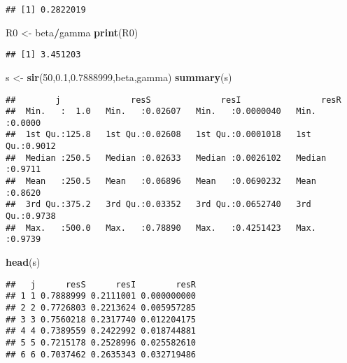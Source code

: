 \documentclass[
]{article}
\newenvironment{Shaded}{\begin{snugshade}}{\end{snugshade}}
\newcommand{\DecValTok}[1]{\textcolor[rgb]{0.00,0.00,0.81}{#1}}
\newcommand{\FloatTok}[1]{\textcolor[rgb]{0.00,0.00,0.81}{#1}}
\newcommand{\KeywordTok}[1]{\textcolor[rgb]{0.13,0.29,0.53}{\textbf{#1}}}
\newcommand{\NormalTok}[1]{#1}
\newcommand{\OperatorTok}[1]{\textcolor[rgb]{0.81,0.36,0.00}{\textbf{#1}}}
\newcommand{\StringTok}[1]{\textcolor[rgb]{0.31,0.60,0.02}{#1}}
\begin{document}
\begin{verbatim}
## [1] 0.2822019
\end{verbatim}

\begin{Shaded}
\begin{Highlighting}[]
\NormalTok{R0 <-}\StringTok{ }\NormalTok{beta}\OperatorTok{/}\NormalTok{gamma}
\KeywordTok{print}\NormalTok{(R0)}
\end{Highlighting}
\end{Shaded}

\begin{verbatim}
## [1] 3.451203
\end{verbatim}

\begin{Shaded}
\begin{Highlighting}[]
\NormalTok{s <-}\StringTok{ }\KeywordTok{sir}\NormalTok{(}\DecValTok{50}\NormalTok{,}\FloatTok{0.1}\NormalTok{,}\FloatTok{0.7888999}\NormalTok{,beta,gamma)}
\KeywordTok{summary}\NormalTok{(s)}
\end{Highlighting}
\end{Shaded}

\begin{verbatim}
##        j              resS              resI                resR       
##  Min.   :  1.0   Min.   :0.02607   Min.   :0.0000040   Min.   :0.0000  
##  1st Qu.:125.8   1st Qu.:0.02608   1st Qu.:0.0001018   1st Qu.:0.9012  
##  Median :250.5   Median :0.02633   Median :0.0026102   Median :0.9711  
##  Mean   :250.5   Mean   :0.06896   Mean   :0.0690232   Mean   :0.8620  
##  3rd Qu.:375.2   3rd Qu.:0.03352   3rd Qu.:0.0652740   3rd Qu.:0.9738  
##  Max.   :500.0   Max.   :0.78890   Max.   :0.4251423   Max.   :0.9739
\end{verbatim}

\begin{Shaded}
\begin{Highlighting}[]
\KeywordTok{head}\NormalTok{(s)}
\end{Highlighting}
\end{Shaded}

\begin{verbatim}
##   j      resS      resI        resR
## 1 1 0.7888999 0.2111001 0.000000000
## 2 2 0.7726803 0.2213624 0.005957285
## 3 3 0.7560218 0.2317740 0.012204175
## 4 4 0.7389559 0.2422992 0.018744881
## 5 5 0.7215178 0.2528996 0.025582610
## 6 6 0.7037462 0.2635343 0.032719486
\end{verbatim}
\end{document}
